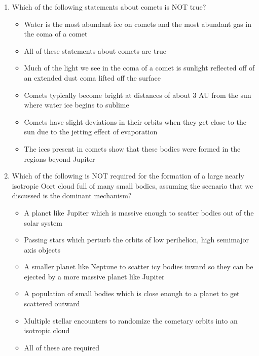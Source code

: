 \begin{enumerate}
    \item[2.] Which of the following statements about comets is NOT true?
    \begin{multicols}{2} \begin{itemize}[label={$\bullet$}]
        \item Water is the most abundant ice on comets and the most abundant gas in the coma of a comet
        \item All of these statements about comets are true      
        \item Much of the light we see in the coma of a comet is sunlight reflected off of an extended dust coma lifted off the surface
        \item Comets typically become bright at distances of about 3 AU from the sun where water ice begins to sublime
        \item Comets have slight deviations in their orbits when they get close to the sun due to the jetting effect of evaporation
        \item The ices present in comets show that these bodies were formed in the regions beyond Jupiter
    \end{itemize}\end{multicols}      
    \item[3.] Which of the following is NOT required for the formation of a large nearly isotropic Oort cloud full of many small bodies, assuming the scenario that we discussed is the dominant mechanism? 
    \begin{multicols}{2} \begin{itemize}[label={$\bullet$}]
        \item A planet like Jupiter which is massive enough to scatter bodies out of the solar system
        \item Passing stars which perturb the orbits of low perihelion, high semimajor axis objects      
        \item A smaller planet like Neptune to scatter icy bodies inward so they can be ejected by a more massive planet like Jupiter
        \item A population of small bodies which is close enough to a planet to get scattered outward
        \item Multiple stellar encounters to randomize the cometary orbits into an isotropic cloud
        \item All of these are required
    \end{itemize}\end{multicols}   

\end{enumerate}

